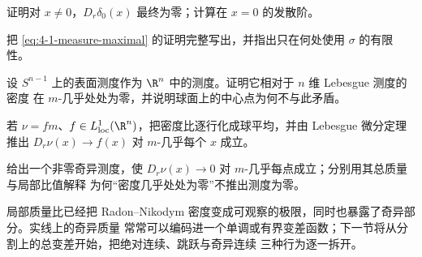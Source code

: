 \begin{exercise}
证明对 $x\ne0$，$D_r\delta_0(x)$ 最终为零；计算在 $x=0$ 的发散阶。
\end{exercise}
\begin{exercise}
把 \eqref{eq:4-1-measure-maximal} 的证明完整写出，并指出只在何处使用 $\sigma$ 的有限性。
\end{exercise}
\begin{exercise}
设 $S^{n-1}$ 上的表面测度作为 $\R^n$ 中的测度。证明它相对于 $n$ 维 Lebesgue 测度的密度
在 $m$-几乎处处为零，并说明球面上的中心点为何不与此矛盾。
\end{exercise}
\begin{exercise}
若 $\nu=fm$、$f\in L^1_{\mathrm{loc}}(\R^n)$，把密度比逐行化成球平均，并由 Lebesgue
微分定理推出 $D_r\nu(x)\to f(x)$ 对 $m$-几乎每个 $x$ 成立。
\end{exercise}
\begin{exercise}
给出一个非零奇异测度，使 $D_r\nu(x)\to0$ 对 $m$-几乎每点成立；分别用其总质量与局部比值解释
为何“密度几乎处处为零”不推出测度为零。
\end{exercise}

局部质量比已经把 Radon--Nikodym 密度变成可观察的极限，同时也暴露了奇异部分。实线上的奇异质量
常常可以编码进一个单调或有界变差函数；下一节将从分割上的总变差开始，把绝对连续、跳跃与奇异连续
三种行为逐一拆开。
